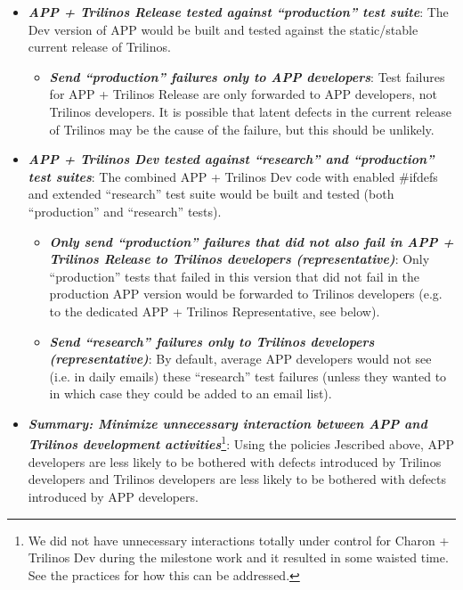 \documentclass[pdf,ps2pdf,11pt]{SANDreport}
\begin{document}
  \begin{itemize}

  {}\item\textit{\textbf{APP + Trilinos Release tested against ``production''
  test suite}}: The Dev version of APP would be built and tested against the
  static/stable current release of Trilinos.

    \begin{itemize}

    {}\item\textit{\textbf{Send ``production'' failures only to APP
    developers}}: Test failures for APP + Trilinos Release are only forwarded
    to APP developers, not Trilinos developers.  It is possible that latent
    defects in the current release of Trilinos may be the cause of the
    failure, but this should be unlikely.

    \end{itemize}

  {}\item\textit{\textbf{APP + Trilinos Dev tested against ``research'' and
  ``production'' test suites}}: The combined APP + Trilinos Dev code with
  enabled {}\#ifdefs and extended ``research'' test suite would be built and
  tested (both ``production'' and ``research'' tests).

    \begin{itemize}

    {}\item\textit{\textbf{Only send ``production'' failures that did not also
    fail in APP + Trilinos Release to Trilinos developers (representative)}}:
    Only ``production'' tests that failed in this version that did not fail in
    the production APP version would be forwarded to Trilinos developers
    (e.g. to the dedicated APP + Trilinos Representative, see below).

    {}\item\textit{\textbf{Send ``research'' failures only to Trilinos
    developers (representative)}}: By default, average APP developers would
    not see (i.e. in daily emails) these ``research'' test failures (unless
    they wanted to in which case they could be added to an email list).

    \end{itemize}

  {}\item\textit{\textbf{Summary: Minimize unnecessary interaction between APP
  and Trilinos development activities}}\footnote{We did not have unnecessary
  interactions totally under control for Charon + Trilinos Dev during the
  milestone work and it resulted in some waisted time.  See the practices for
  how this can be addressed.}: Using the policies Jescribed above, APP
  developers are less likely to be bothered with defects introduced by
  Trilinos developers and Trilinos developers are less likely to be bothered
  with defects introduced by APP developers.
                
  \end{itemize}
\end{document}
